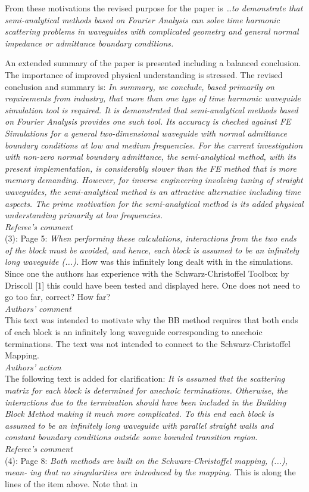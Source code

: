 \documentclass[a4paper,12pt]{article}%
\begin{document}
From these  motivations the revised purpose for the paper is \emph{\ldots to demonstrate that
semi-analytical methods based on Fourier Analysis can solve time
harmonic scattering problems in waveguides with complicated geometry
and general normal impedance or admittance boundary conditions.}

An extended summary of the paper is presented including a balanced conclusion. The importance of improved physical understanding is stressed. The revised conclusion and summary is: \emph{In summary, we conclude, based primarily on requirements from industry, that more than one type of time harmonic waveguide simulation tool is required. It is demonstrated that semi-analytical methods based on Fourier Analysis provides one such tool. Its accuracy is checked against FE Simulations for a general two-dimensional waveguide with normal admittance boundary conditions at low and medium frequencies. For the current investigation with non-zero normal boundary admittance, the semi-analytical method, with its present implementation, is considerably slower than the FE method that is more memory demanding. However, for inverse engineering involving tuning of straight waveguides, the semi-analytical method is an attractive alternative including time aspects. The prime motivation for the semi-analytical method is its added physical understanding primarily at low frequencies.}\\
\newline
{\it Referee's comment}\\
(3): Page 5: \textit{When performing these calculations, interactions from the two ends
of the block must be avoided, and hence, each block is assumed to be an infinitely long
waveguide (...).} How was this infinitely long dealt with in the simulations. Since one the
authors has experience with the Schwarz-Christoffel Toolbox by Driscoll [1] this could
have been tested and displayed here. One does not need to go too far, correct? How
far?\\
{\it Authors' comment}\\
This text was intended to motivate why the BB method requires that both ends of each block is an infinitely long waveguide corresponding to anechoic terminations. The text was not intended to connect to the Schwarz-Christoffel Mapping.\\
{\it Authors' action}\\
The following text is added for clarification: 
\emph{It is assumed that the scattering matrix for
each block is determined for anechoic terminations. Otherwise, the
interactions due to the termination should have been included in the
Building Block Method making it much more complicated. To this end
each block is assumed to be an infinitely long waveguide with parallel
straight walls and constant boundary conditions outside some bounded
transition region.}\\
\newline
{\it Referee's comment}\\
(4): Page 8: \textit{Both methods are built on the Schwarz-Christoffel mapping, (...), mean-
ing that no singularities are introduced by the mapping.} This is along the lines of the
item above. Note that in\\
\end{document}

